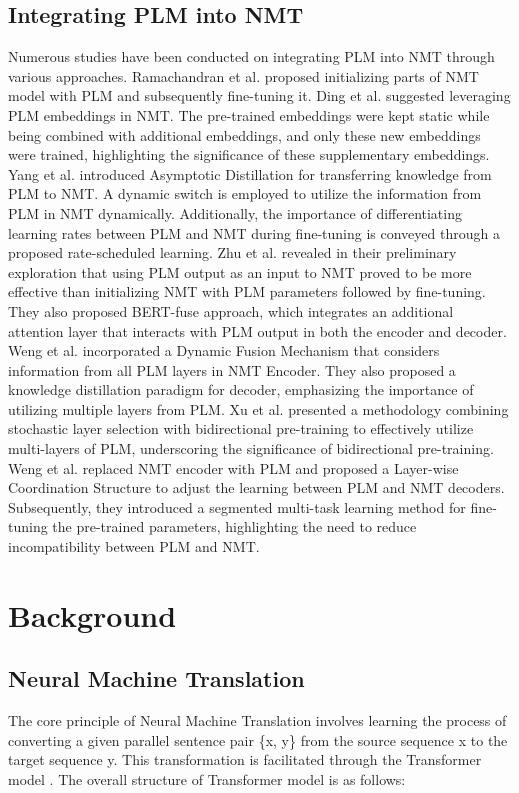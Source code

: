 \documentclass[conference]{IEEEtran}
\begin{document}
\subsection{Integrating PLM into NMT}
Numerous studies have been conducted on integrating PLM into NMT through various approaches.
Ramachandran et al. \cite{Ramachandran2016} proposed initializing parts of NMT model with PLM and subsequently fine-tuning it.
Ding et al. \cite{Ding2018} suggested leveraging PLM embeddings in NMT. The pre-trained embeddings were kept static while being combined with additional embeddings, and only these new embeddings were trained, highlighting the significance of these supplementary embeddings.
Yang et al. \cite{Yang2019} introduced Asymptotic Distillation for transferring knowledge from PLM to NMT. A dynamic switch is employed to utilize the information from PLM in NMT dynamically. Additionally, the importance of differentiating learning rates between PLM and NMT during fine-tuning is conveyed through a proposed rate-scheduled learning.
Zhu et al. \cite{zhu2020incorporating} revealed in their preliminary exploration that using PLM output as an input to NMT proved to be more effective than initializing NMT with PLM parameters followed by fine-tuning. They also proposed BERT-fuse approach, which integrates an additional attention layer that interacts with PLM output in both the encoder and decoder.
Weng et al. \cite{weng2020acquiring} incorporated a Dynamic Fusion Mechanism that considers information from all PLM layers in NMT Encoder. They also proposed a knowledge distillation paradigm for decoder, emphasizing the importance of utilizing multiple layers from PLM.
Xu et al. \cite{xu2021bibert} presented a methodology combining stochastic layer selection with bidirectional pre-training to effectively utilize multi-layers of PLM, underscoring the significance of bidirectional pre-training.
Weng et al. \cite{Weng2022} replaced NMT encoder with PLM and proposed a Layer-wise Coordination Structure to adjust the learning between PLM and NMT decoders. Subsequently, they introduced a segmented multi-task learning method for fine-tuning the pre-trained parameters, highlighting the need to reduce incompatibility between PLM and NMT.


\section{Background}
\subsection{Neural Machine Translation}
The core principle of Neural Machine Translation involves learning the process of converting a given parallel sentence pair \{x, y\} from the source sequence x to the target sequence y. This transformation is facilitated through the Transformer model \cite{vaswani2017attention}. The overall structure of Transformer model is as follows:
\end{document}
